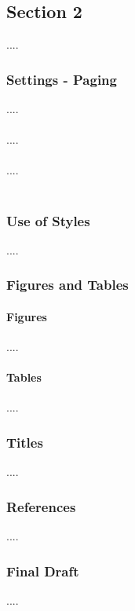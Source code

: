 \subsection{Section 2}

\begin{flushleft}
    ....
\end{flushleft}

\subsubsection{Settings - Paging}

\begin{flushleft}
    ....\\~\\

    ....\\~\\
    
    ....\\~\\
\end{flushleft}


\subsubsection{Use of Styles}

\begin{flushleft}
    ....
\end{flushleft}

\subsubsection{Figures and Tables}

\paragraph{Figures}

\begin{flushleft}
    ....
\end{flushleft}

\paragraph{Tables}

\begin{flushleft}
    ....
\end{flushleft}

\subsubsection{Titles}

\begin{flushleft}
    ....
\end{flushleft}

\subsubsection{References}

\begin{flushleft}
    ....
\end{flushleft}

\subsubsection{Final Draft}

\begin{flushleft}
    ....
\end{flushleft}